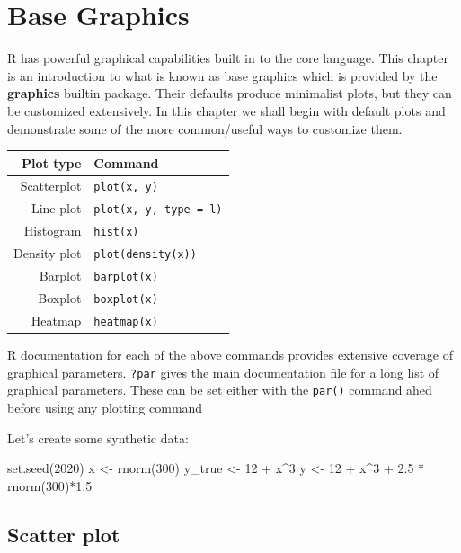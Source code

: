 \documentclass[
]{book}
\newenvironment{Shaded}{\begin{snugshade}}{\end{snugshade}}
\newcommand{\DecValTok}[1]{\textcolor[rgb]{0.00,0.00,0.81}{#1}}
\newcommand{\FloatTok}[1]{\textcolor[rgb]{0.00,0.00,0.81}{#1}}
\newcommand{\FunctionTok}[1]{\textcolor[rgb]{0.00,0.00,0.00}{#1}}
\newcommand{\NormalTok}[1]{#1}
\newcommand{\OtherTok}[1]{\textcolor[rgb]{0.56,0.35,0.01}{#1}}
\newcommand{\SpecialCharTok}[1]{\textcolor[rgb]{0.00,0.00,0.00}{#1}}
\begin{document}
\hypertarget{basegraphics}{%
\chapter{Base Graphics}\label{basegraphics}}

R has powerful graphical capabilities built in to the core language. This chapter is an introduction to what is known as base graphics which is provided by the \textbf{graphics} builtin package. Their defaults produce minimalist plots, but they can be customized extensively. In this chapter we shall begin with default plots and demonstrate some of the more common/useful ways to customize them.

\begin{longtable}[]{@{}rl@{}}
\toprule
Plot type & Command\tabularnewline
\midrule
\endhead
Scatterplot & \texttt{plot(x,\ y)}\tabularnewline
Line plot & \texttt{plot(x,\ y,\ type\ =\ \textquotesingle{}l\textquotesingle{})}\tabularnewline
Histogram & \texttt{hist(x)}\tabularnewline
Density plot & \texttt{plot(density(x))}\tabularnewline
Barplot & \texttt{barplot(x)}\tabularnewline
Boxplot & \texttt{boxplot(x)}\tabularnewline
Heatmap & \texttt{heatmap(x)}\tabularnewline
\bottomrule
\end{longtable}

R documentation for each of the above commands provides extensive coverage of graphical parameters. \texttt{?par} gives the main documentation file for a long list of graphical parameters. These can be set either with the \texttt{par()} command ahed before using any plotting command

Let's create some synthetic data:

\begin{Shaded}
\begin{Highlighting}[]
\FunctionTok{set.seed}\NormalTok{(}\DecValTok{2020}\NormalTok{)}
\NormalTok{x }\OtherTok{\textless{}{-}} \FunctionTok{rnorm}\NormalTok{(}\DecValTok{300}\NormalTok{)}
\NormalTok{y\_true }\OtherTok{\textless{}{-}} \DecValTok{12} \SpecialCharTok{+}\NormalTok{ x}\SpecialCharTok{\^{}}\DecValTok{3}
\NormalTok{y }\OtherTok{\textless{}{-}} \DecValTok{12} \SpecialCharTok{+}\NormalTok{ x}\SpecialCharTok{\^{}}\DecValTok{3} \SpecialCharTok{+} \FloatTok{2.5} \SpecialCharTok{*} \FunctionTok{rnorm}\NormalTok{(}\DecValTok{300}\NormalTok{)}\SpecialCharTok{*}\FloatTok{1.5}
\end{Highlighting}
\end{Shaded}

\hypertarget{scatter-plot}{%
\section{Scatter plot}\label{scatter-plot}}
\end{document}
